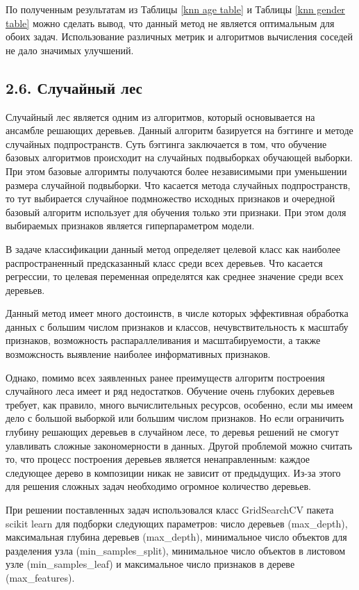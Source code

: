 По полученным результатам из Таблицы \ref{knn age table} и  Таблицы \ref{knn gender table} можно сделать вывод, что данный метод не является оптимальным для обоих задач. Использование различных метрик и алгоритмов вычисления соседей не дало значимых улучшений. 

\subsection{2.6. Случайный лес}
Случайный лес \cite{random forest} является одним из алгоритмов, который основывается на ансамбле решающих деревьев. Данный алгоритм базируется на бэггинге и методе случайных подпространств. Суть бэггинга заключается в том, что обучение базовых алгоритмов происходит на случайных подвыборках обучающей выборки. При этом базовые алгоримты получаются более независимыми при уменьшении размера случайной подвыборки. Что касается метода случайных подпространств, то тут выбирается случайное подмножество исходных признаков и очередной базовый алгоритм использует для обучения только эти признаки. При этом доля выбираемых признаков является гиперпараметром модели.

В задаче классификации данный метод определяет целевой класс как наиболее распространенный предсказанный класс среди всех деревьев. Что касается регрессии, то целевая переменная определятся как среднее значение среди всех деревьев.  

Данный метод имеет много достоинств, в числе которых эффективная обработка данных с большим числом признаков и классов, нечувствительность к масштабу признаков, возможность распараллеливания и масштабируемости, а также возможсность выявление наиболее информативных признаков.

Однако, помимо всех заявленных ранее преимуществ алгоритм построения случайного леса имеет и ряд недостатков. Обучение очень глубоких деревьев требует, как правило, много вычислительных ресурсов,
особенно, если мы имеем дело с большой выборкой или большим числом признаков. Но если ограничить глубину решающих деревьев в случайном лесе, то деревья решений не смогут улавливать сложные
закономерности в данных. Другой проблемой можно считать то, что процесс построения деревьев является ненаправленным: каждое следующее дерево в композиции никак не зависит от предыдущих. Из-за этого для решения сложных задач необходимо огромное количество деревьев. 

При решении поставленных задач использовался класс GridSearchCV пакета scikit learn для подборки следующих параметров: число деревьев (max\_depth), максимальная глубина деревьев (max\_depth), минимальное число объектов для разделения узла (min\_samples\_split), минимальное число объектов в листовом узле (min\_samples\_leaf) и максимальное число признаков в дереве (max\_features).

